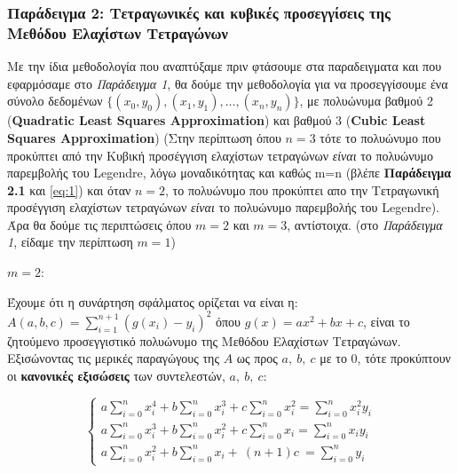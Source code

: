 \documentclass[12pt]{article}
\begin{document}
    

    \hypertarget{ux3c0ux3b1ux3c1ux3acux3b4ux3b5ux3b9ux3b3ux3bcux3b1-2-ux3c4ux3b5ux3c4ux3c1ux3b1ux3b3ux3c9ux3bdux3b9ux3baux3adux3c2-ux3baux3b1ux3b9-ux3baux3c5ux3b2ux3b9ux3baux3adux3c2-ux3c0ux3c1ux3bfux3c3ux3b5ux3b3ux3b3ux3afux3c3ux3b5ux3b9ux3c2-ux3c4ux3b7ux3c2-ux3bcux3b5ux3b8ux3ccux3b4ux3bfux3c5-ux3b5ux3bbux3b1ux3c7ux3afux3c3ux3c4ux3c9ux3bd-ux3c4ux3b5ux3c4ux3c1ux3b1ux3b3ux3ceux3bdux3c9ux3bd}{%
\subsubsection{Παράδειγμα 2: Τετραγωνικές και κυβικές προσεγγίσεις της
Μεθόδου Ελαχίστων Τετραγώνων}}

    Με την ίδια μεθοδολογία που αναπτύξαμε πριν φτάσουμε στα παραδειγματα
και που εφαρμόσαμε στο \emph{Παράδειγμα 1}, θα δούμε την μεθοδολογία για
να προσεγγίσουμε ένα σύνολο δεδομένων
\(\{(x_0,y_0),(x_1,y_1),\dots,(x_{n},y_{n})\}\), με πολυώνυμα βαθμού 2
(\textbf{Quadratic Least Squares Approximation}) και βαθμού 3
(\textbf{Cubic Least Squares Approximation}) (Στην περίπτωση όπου
\(n=3\) τότε το πολυώνυμο που προκύπτει από την Κυβική προσέγγιση
ελαχίστων τετραγώνων \emph{είναι} το πολυώνυμο παρεμβολής του Legendre,
λόγω μοναδικότητας και καθώς m=n (βλέπε \textbf{Παράδειγμα 2.1} και
\eqref{eq:1}) και όταν \(n=2\), το πολυώνυμο που προκύπτει απο την
Τετραγωνική προσέγγιση ελαχίστων τετραγώνων \emph{είναι} το πολυώνυμο
παρεμβολής του Legendre). Άρα θα δούμε τις περιπτώσεις όπου \(m=2\) και
\(m=3\), αντίστοιχα. (στο \emph{Παράδειγμα 1}, είδαμε την περίπτωση
\(m=1\))

{\Large $m=2$:}

Έχουμε ότι η συνάρτηση σφάλματος ορίζεται να είναι η:
\(A(a,b,c)=\sum_{i=1}^{n+1}(g(x_i)-y_i)^2\) όπου \(g(x)=ax^2+bx+c\),
είναι το ζητούμενο προσεγγιστικό πολυώνυμο της Μεθόδου Ελαχίστων
Τετραγώνων. Εξισώνοντας τις μερικές παραγώγους της \(A\) ως προς
\(a, \ b, \ c\) με το \(0\), τότε προκύπτουν οι \textbf{κανονικές
εξισώσεις} των συντελεστών, \(a, \ b, \ c\):

\[
\begin{cases}
a\sum_{i=0}^n x_i^4+b\sum_{i=0}^n x_i^3+c\sum_{i=0}^n x_i^2 = \sum_{i=0}^n x_i^2y_i \\
a\sum_{i=0}^n x_i^3+b\sum_{i=0}^n x_i^2+c\sum_{i=0}^n x_i = \sum_{i=0}^n x_iy_i \\
a\sum_{i=0}^n x_i^2+b\sum_{i=0}^n x_i+ \ (n+1)c \ = \sum_{i=0}^n y_i 
\end{cases} \nonumber
\]
\end{document}
